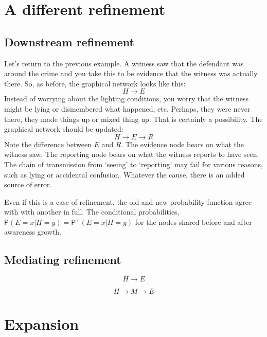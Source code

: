 \documentclass[
  11pt,
  dvipsnames,enabledeprecatedfontcommands]{scrartcl}
\newcommand{\pr}[1]{\ensuremath{\mathsf{P}(#1)}}
\newcommand{\ppr}[2]{\ensuremath{\mathsf{P}^{#1}(#2)}}
\begin{document}
\hypertarget{a-different-refinement}{%
\section{A different refinement}\label{a-different-refinement}}

\hypertarget{downstream-refinement}{%
\subsection{Downstream refinement}\label{downstream-refinement}}

Let's return to the previous example. A witness saw that the defendant
was around the crime and you take this to be evidence that the witness
was actually there. So, as before, the graphical network looks like
this: \[H\rightarrow E\] Instead of worrying about the lighting
conditions, you worry that the witness might be lying or dismembered
what happened, etc. Perhaps, they were never there, they made things up
or mixed thing up. That is certainly a possibility. The graphical
network should be updated: \[H\rightarrow E \rightarrow R\] Note the
difference between \(E\) and \(R\). The evidence node bears on what the
witness saw. The reporting node bears on what the witness reports to
have seen. The chain of transmission from `seeing' to `reporting' may
fail for various reasons, such as lying or accidental confusion.
Whatever the cause, there is an added source of error.

Even if this is a case of
refinement, the old and new
probability function agree with with another in full. The conditional
probabilities, \(\pr{E=x \vert H=y}=\ppr{+}{E=x \vert H=y}\) for the
nodes shared before and after awareness growth.

\hypertarget{mediating-refinement}{%
\subsection{Mediating refinement}\label{mediating-refinement}}

\[H\rightarrow E\]

\[H\rightarrow M \rightarrow E\]

\hypertarget{expansion}{%
\section{Expansion}\label{expansion}}
\end{document}

